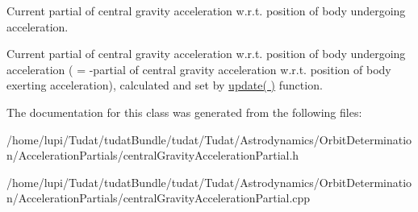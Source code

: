 Current partial of central gravity acceleration w.\+r.\+t. position of body undergoing acceleration. 

Current partial of central gravity acceleration w.\+r.\+t. position of body undergoing acceleration ( = -\/partial of central gravity acceleration w.\+r.\+t. position of body exerting acceleration), calculated and set by \hyperlink{classtudat_1_1acceleration__partials_1_1CentralGravitationPartial_a340849314fd38579fdbf17d58b197be8}{update( )} function. 

The documentation for this class was generated from the following files\+:\begin{DoxyCompactItemize}
\item 
/home/lupi/\+Tudat/tudat\+Bundle/tudat/\+Tudat/\+Astrodynamics/\+Orbit\+Determination/\+Acceleration\+Partials/central\+Gravity\+Acceleration\+Partial.\+h\item 
/home/lupi/\+Tudat/tudat\+Bundle/tudat/\+Tudat/\+Astrodynamics/\+Orbit\+Determination/\+Acceleration\+Partials/central\+Gravity\+Acceleration\+Partial.\+cpp\end{DoxyCompactItemize}
